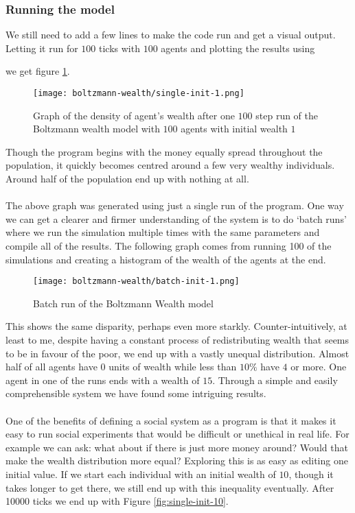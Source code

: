 \subsubsection{Running the model}
We still need to add a few lines to make the code run and get a visual output. Letting it run for $100$ ticks with $100$ agents and plotting the results using

we get figure \ref{fig:single-init-1}.
\begin{figure}[h!]
	\centering
	\texttt{[image: boltzmann-wealth/single-init-1.png]}
	\caption{Graph of the density of agent's wealth after one $100$ step run of the Boltzmann wealth model with $100$ agents with initial wealth $1$}
	\label{fig:single-init-1}
\end{figure}
Though the program begins with the money equally spread throughout the population, it quickly becomes centred around a few very wealthy individuals. Around half of the population end up with nothing at all.\\
\\
The above graph was generated using just a single run of the program. One way we can get a clearer and firmer understanding of the system is to do `batch runs' where we run the simulation multiple times with the same parameters and compile all of the results. The following graph comes from running 100 of the simulations and creating a histogram of the wealth of the agents at the end.
\begin{figure}[!h]
	\centering
	\texttt{[image: boltzmann-wealth/batch-init-1.png]}
	\caption{Batch run of the Boltzmann Wealth model}
	\label{fig:batch-init-1}
\end{figure}
This shows the same disparity, perhaps even more starkly. Counter-intuitively, at least to me, despite having a constant process of redistributing wealth that seems to be in favour of the poor, we end up with a vastly unequal distribution. Almost half of all agents have 0 units of wealth while less than $10\%$ have $4$ or more. One agent in one of the runs ends with a wealth of $15$. Through a simple and easily comprehensible system we have found some intriguing results.\\
\\
One of the benefits of defining a social system as a program is that it makes it easy to run social experiments that would be difficult or unethical in real life. For example we can ask: what about if there is just more money around? Would that make the wealth distribution more equal? Exploring this is as easy as editing one initial value. If we start each individual with an initial wealth of $10$, though it takes longer to get there, we still end up with this inequality eventually. After 10000 ticks we end up with Figure \ref{fig:single-init-10}.
